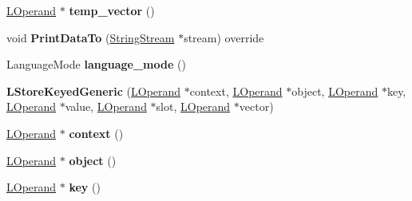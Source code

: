 \begin{DoxyCompactItemize}
\item 
\hyperlink{classv8_1_1internal_1_1_l_operand}{L\+Operand} $\ast$ {\bfseries temp\+\_\+vector} ()\hypertarget{classv8_1_1internal_1_1_l_store_keyed_generic_a8e332b61e68443ed2a912b79cbf01438}{}\label{classv8_1_1internal_1_1_l_store_keyed_generic_a8e332b61e68443ed2a912b79cbf01438}

\item 
void {\bfseries Print\+Data\+To} (\hyperlink{classv8_1_1internal_1_1_string_stream}{String\+Stream} $\ast$stream) override\hypertarget{classv8_1_1internal_1_1_l_store_keyed_generic_ab0d8e8441ce3f1b71da8ce0ccf807df8}{}\label{classv8_1_1internal_1_1_l_store_keyed_generic_ab0d8e8441ce3f1b71da8ce0ccf807df8}

\item 
Language\+Mode {\bfseries language\+\_\+mode} ()\hypertarget{classv8_1_1internal_1_1_l_store_keyed_generic_a279b2804fdca1b8181ce7a4b2e7a0d88}{}\label{classv8_1_1internal_1_1_l_store_keyed_generic_a279b2804fdca1b8181ce7a4b2e7a0d88}

\item 
{\bfseries L\+Store\+Keyed\+Generic} (\hyperlink{classv8_1_1internal_1_1_l_operand}{L\+Operand} $\ast$context, \hyperlink{classv8_1_1internal_1_1_l_operand}{L\+Operand} $\ast$object, \hyperlink{classv8_1_1internal_1_1_l_operand}{L\+Operand} $\ast$key, \hyperlink{classv8_1_1internal_1_1_l_operand}{L\+Operand} $\ast$value, \hyperlink{classv8_1_1internal_1_1_l_operand}{L\+Operand} $\ast$slot, \hyperlink{classv8_1_1internal_1_1_l_operand}{L\+Operand} $\ast$vector)\hypertarget{classv8_1_1internal_1_1_l_store_keyed_generic_af091880976ae47ab5668f689b739343e}{}\label{classv8_1_1internal_1_1_l_store_keyed_generic_af091880976ae47ab5668f689b739343e}

\item 
\hyperlink{classv8_1_1internal_1_1_l_operand}{L\+Operand} $\ast$ {\bfseries context} ()\hypertarget{classv8_1_1internal_1_1_l_store_keyed_generic_a4f167d2748fbfa19937cabab260ea080}{}\label{classv8_1_1internal_1_1_l_store_keyed_generic_a4f167d2748fbfa19937cabab260ea080}

\item 
\hyperlink{classv8_1_1internal_1_1_l_operand}{L\+Operand} $\ast$ {\bfseries object} ()\hypertarget{classv8_1_1internal_1_1_l_store_keyed_generic_af1106ab73c930b73c937d138a3b68d6e}{}\label{classv8_1_1internal_1_1_l_store_keyed_generic_af1106ab73c930b73c937d138a3b68d6e}

\item 
\hyperlink{classv8_1_1internal_1_1_l_operand}{L\+Operand} $\ast$ {\bfseries key} ()\hypertarget{classv8_1_1internal_1_1_l_store_keyed_generic_a8e5ab828ddbab917cc744e7c6022259d}{}\label{classv8_1_1internal_1_1_l_store_keyed_generic_a8e5ab828ddbab917cc744e7c6022259d}


\end{DoxyCompactItemize}
